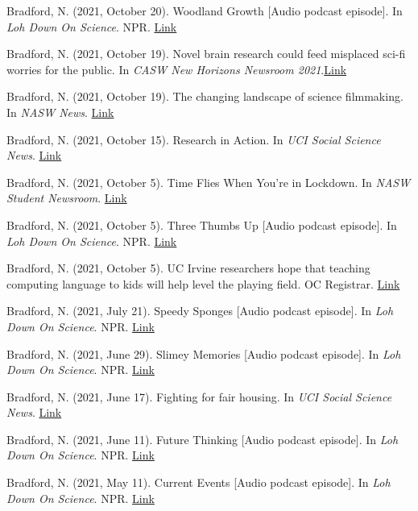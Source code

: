 \documentclass[margin, 10pt]{res} %
\begin{document}
\begin{resume}
Bradford, N. (2021, October 20). Woodland Growth [Audio podcast episode]. In {\sl Loh Down On Science}. NPR. \href{https://lohdownonscience.com/woodland-growth/}{Link}

Bradford, N. (2021, October 19). Novel brain research could feed misplaced sci-fi worries for the public. In {\sl CASW New Horizons Newsroom 2021}.\href{https://casw.org/news/novel-brain-research-could-feed-misplaced-sci-fi-worries-for-the-public/}{Link} 

Bradford, N. (2021, October 19). The changing landscape of science filmmaking. In {\sl NASW News}. \href{https://www.nasw.org/article/changing-landscape-science-filmmaking}{Link} 

Bradford, N. (2021, October 15). Research in Action. In {\sl UCI Social Science News}. \href{https://www.socsci.uci.edu/newsevents/news/2021/2021-10-15-gillooly.php}{Link} 

Bradford, N. (2021, October 5). Time Flies When You're in Lockdown. In {\sl NASW Student Newsroom}. \href{https://nasw.org/article/time-flies-when-youre-lockdown}{Link}

Bradford, N. (2021, October 5). Three Thumbs Up [Audio podcast episode]. In {\sl Loh Down On Science}. NPR. \href{https://lohdownonscience.com/three-thumbs-up/}{Link}

Bradford, N. (2021, October 5). UC Irvine researchers hope that teaching computing language to kids will help level the playing field. OC Registrar. \href{https://www.ocregister.com/2021/10/05/uc-irvine-researchers-hope-that-teaching-computing-language-to-kids-will-help-level-the-playing-field/}{Link}

Bradford, N. (2021, July 21). Speedy Sponges [Audio podcast episode]. In {\sl Loh Down On Science}. NPR. \href{https://lohdownonscience.com/speedy-sponges/}{Link}

Bradford, N. (2021, June 29). Slimey Memories [Audio podcast episode]. In {\sl Loh Down On Science}. NPR. \href{https://lohdownonscience.com/slimey-memories/}{Link}

Bradford, N. (2021, June 17). Fighting for fair housing. In {\sl UCI Social Science News}. \href{https://www.socsci.uci.edu/newsevents/news/2021/2021-06-17-schmidt-haynes-foundation.php}{Link}

Bradford, N. (2021, June 11). Future Thinking [Audio podcast episode]. In {\sl Loh Down On Science}. NPR. \href{https://lohdownonscience.com/future-thinking/}{Link} 

Bradford, N. (2021, May 11). Current Events [Audio podcast episode]. In {\sl Loh Down On Science}. NPR. \href{https://lohdownonscience.com/current-events/}{Link}


\end{resume}
\end{document}
